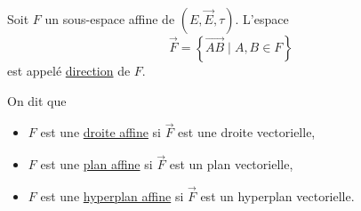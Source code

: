 \begin{defn}
	Soit $F$ un sous-espace affine de $\left( E, \vec{E}, \tau \right)$. L'espace \[
		\vec{F} = \left\{ \vec{AB}  \mid A,B \in F \right\}
	\] est appelé \underline{direction} de $F$.

	On dit que
	\begin{itemize}
		\item $F$ est une \underline{droite affine} si $\vec{F}$ est une droite vectorielle,
		\item $F$ est une \underline{plan affine} si $\vec{F}$ est un plan vectorielle,
		\item $F$ est une \underline{hyperplan affine} si $\vec{F}$ est un hyperplan vectorielle.
	\end{itemize}
\end{defn}

